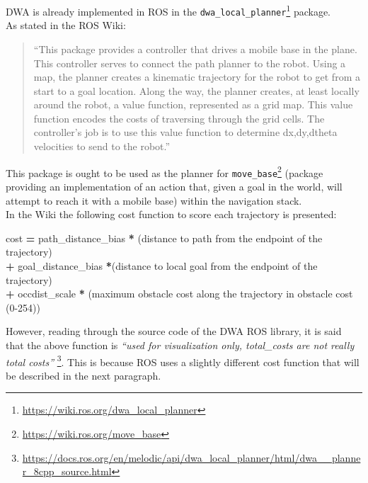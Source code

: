 \documentclass[11pt,a4paper]{article}
\begin{document}
DWA is already implemented in ROS in the \texttt{dwa\_local\_planner}\footnote
{\href{https://wiki.ros.org/dwa\_local\_planner}{https://wiki.ros.org/dwa\_local\_planner}} package.\\

As stated in the ROS Wiki:
\begin{quote}
    ``This package provides a controller that drives a mobile base in the plane. This controller serves to connect the path planner to the robot. Using a map, the planner creates a kinematic trajectory for the robot to get from a start to a goal location. Along the way, the planner creates, at least locally around the robot, a value function, represented as a grid map. This value function encodes the costs of traversing through the grid cells. The controller's job is to use this value function to determine dx,dy,dtheta velocities to send to the robot.''
\end{quote}

This package is ought to be used as the planner for \texttt{move\_base}\footnote
{\href{https://wiki.ros.org/move\_base}{https://wiki.ros.org/move\_base}} (package providing an
implementation of an action that, given a goal in the world, will attempt to reach it with a mobile
base) within the navigation stack.\\

In the Wiki the following cost function to score each trajectory is presented:

\begin{tcolorbox}[enhanced,width=6in,center,size=fbox]

cost \textbf{=} path\_distance\_bias \textbf{*} (distance to path from the endpoint of the trajectory)\\
    \hspace*{4em}\textbf{+} goal\_distance\_bias \textbf{*}(distance to local goal from the endpoint of the trajectory)\\
    \hspace*{4em}\textbf{+} occdist\_scale \textbf{*} (maximum obstacle cost along the trajectory in obstacle cost (0-254))

\end{tcolorbox}

However, reading through the source code of the DWA ROS library, it is said that the above function is
\textit{``used for visualization only, total\_costs are not really total costs''}
\footnote{\href{https://docs.ros.org/en/melodic/api/dwa\_local\_planner/html/dwa\_\_planner\_8cpp\_source.html}
{https://docs.ros.org/en/melodic/api/dwa\_local\_planner/html/dwa\_\_planner\_8cpp\_source.html}}.
This is because ROS uses a slightly different cost function that will be described in the next paragraph.
\end{document}
